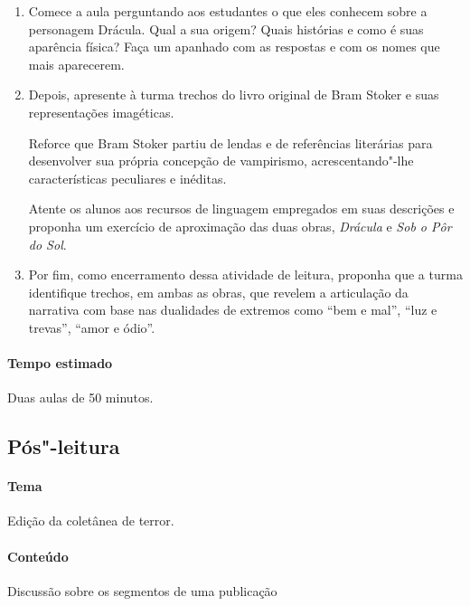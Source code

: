 \documentclass[12pt]{extarticle}
\begin{document}
\begin{enumerate}
\item
Comece a aula perguntando aos estudantes o que eles conhecem sobre a personagem Drácula. 
Qual a sua origem? Quais histórias e como é suas aparência física? Faça um apanhado
com as respostas e com os nomes que mais aparecerem.

\item
Depois, apresente à turma trechos do livro original de Bram Stoker e suas representações 
imagéticas. 

Reforce que Bram Stoker partiu de lendas e de referências literárias
para desenvolver sua própria concepção de vampirismo, acrescentando"-lhe
características peculiares e inéditas.

Atente os alunos aos recursos de linguagem empregados em suas descrições e proponha 
um exercício de aproximação das duas obras, \emph{Drácula} e \emph{Sob o Pôr do Sol}.

\item
Por fim, como encerramento dessa atividade de leitura, proponha que a turma identifique 
trechos, em ambas as obras, que revelem a articulação da narrativa com base nas dualidades 
de extremos como ``bem e mal'', ``luz e trevas'', ``amor e ódio''.




\end{enumerate}

\paragraph{Tempo estimado} Duas aulas de 50 minutos.


\subsection{Pós"-leitura}

\paragraph{Tema} Edição da coletânea de terror.

\paragraph{Conteúdo} Discussão sobre os segmentos de uma publicação
\end{document}
